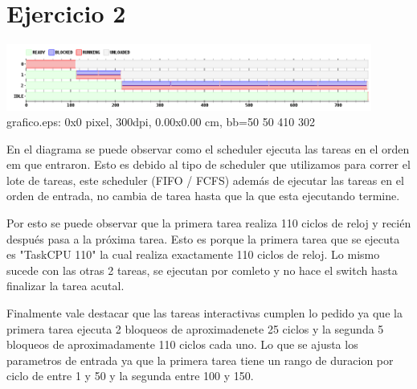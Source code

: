 \section{Ejercicio 2}

\begin {center}
\includegraphics[width=12cm]{../simusched/outputs/outEj2.png}
 grafico.eps: 0x0 pixel, 300dpi, 0.00x0.00 cm, bb=50 50 410 302
\end {center}


En el diagrama se puede observar como el scheduler ejecuta las tareas en el orden em que entraron. Esto es debido al tipo de scheduler que utilizamos para correr el lote de tareas, este scheduler (FIFO / FCFS) además de ejecutar las tareas en el orden de entrada, no cambia de tarea hasta que la que esta ejecutando termine. 

Por esto se puede observar que la primera tarea realiza 110 ciclos de reloj y recién después pasa a la próxima tarea. Esto es porque la primera tarea que se ejecuta es "TaskCPU 110" la cual realiza exactamente 110 ciclos de reloj. Lo mismo sucede con las otras 2 tareas, se ejecutan por comleto y no hace el switch hasta finalizar la tarea acutal.

Finalmente vale destacar que las tareas interactivas cumplen lo pedido ya que la primera tarea ejecuta 2 bloqueos de aproximadenete 25 ciclos y la segunda 5 bloqueos de aproximadamente 110 ciclos cada uno. Lo que se ajusta los parametros de entrada ya que la primera tarea tiene un rango de duracion por ciclo de entre 1 y 50 y la segunda entre 100 y 150.
